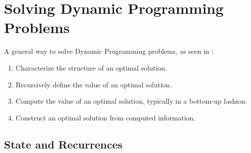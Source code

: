 \section{Solving Dynamic Programming Problems}

A general way to solve Dynamic Programming problems, as seen in \cite{cormen2009introduction}:

\begin{enumerate}
  \item Characterize the structure of an optimal solution.
  \item Recursively define the value of an optimal solution.
  \item Compute the value of an optimal solution, typically in a bottom-up fashion.
  \item Construct an optimal solution from computed information.
\end{enumerate}

\subsection{State and Recurrences}
